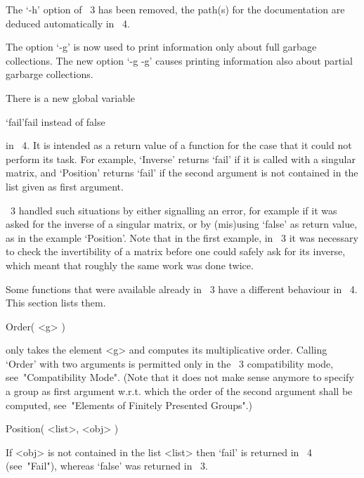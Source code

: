 The `-h' option of {\GAP}~3 has been removed,
the path(s) for the documentation are deduced automatically in {\GAP}~4.

The option `-g' is now used to print information only about full garbage
collections.
The new option `-g -g' causes printing information also about partial
garbarge collections.



There is a new global variable

\>`fail'{fail instead of false}

in {\GAP}~4.
It is intended as a return value of a function for the case that it
could not perform its task.
For example, `Inverse' returns `fail' if it is called with a singular
matrix, and `Position' returns `fail' if the second argument is not
contained in the list given as first argument.

{\GAP}~3 handled such situations by either signalling an error,
for example if it was asked for the inverse of a singular matrix,
or by (mis)using `false' as return value, as in the example `Position'.
Note that in the first example, in {\GAP}~3 it was necessary to check
the invertibility of a matrix before one could safely ask for its
inverse, which meant that roughly the same work was done twice.



Some functions that were available already in {\GAP}~3 have a different
behaviour in {\GAP}~4.  This section lists them.

% 

\>Order( <g> )

only takes the element <g> and computes its multiplicative order.
Calling `Order' with two arguments is permitted only in the
{\GAP}~3 compatibility mode, see~"Compatibility Mode".
(Note that it does not make sense anymore to specify a group as
first argument w.r.t. which the order of the second argument shall
be computed, see~"Elements of Finitely Presented Groups".)

\>Position( <list>, <obj> )

If <obj> is not contained in the list <list> then `fail' is returned
in {\GAP}~4 (see~"Fail"), whereas `false' was returned in {\GAP}~3.

